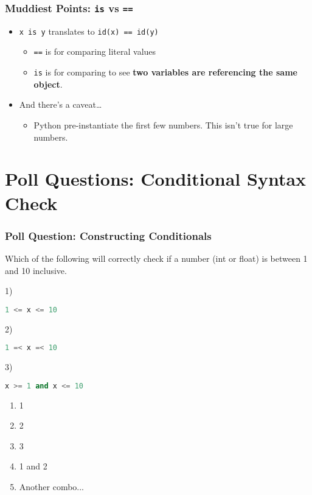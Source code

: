 \documentclass{beamer}
\begin{document}
%
%
\begin{frame}[fragile]
	\frametitle{Muddiest Points: \lstinline|is| vs \lstinline|==|}
  \begin{itemize}
    \item \lstinline|x is y| translates to \lstinline|id(x) == id(y)|
    \begin{itemize}
      \item \lstinline|==| is for comparing literal values
      \item \lstinline|is| is for comparing to see \textbf{two variables are referencing the same object}.
    \end{itemize}
    \item And there's a caveat\ldots 
    \begin{itemize}
      \item Python pre-instantiate the first few numbers. This isn't true for large numbers.
    \end{itemize}
  \end{itemize}
\end{frame}


\section{Poll Questions: Conditional Syntax Check}

%
%
\begin{frame}[fragile]
	\frametitle{Poll Question: Constructing Conditionals}
  Which of the following will correctly check if a number (int or float) is between 1 and 10 inclusive.
	\begin{minipage}{0.69\textwidth}
    1)
		\begin{lstlisting}[language=Python, autogobble,basicstyle=\tiny,numbers=none]
    1 <= x <= 10
		\end{lstlisting}
    \vspace{1cm}
    2)
		\begin{lstlisting}[language=Python, autogobble,basicstyle=\tiny,numbers=none]
    1 =< x =< 10
		\end{lstlisting}
    \vspace{1cm}
    3)
		\begin{lstlisting}[language=Python, autogobble,basicstyle=\tiny,numbers=none]
    x >= 1 and x <= 10
		\end{lstlisting}
	\end{minipage}
	\begin{minipage}{0.29\textwidth}
    \begin{enumerate}[A]
      \item 1
      \item 2
      \item 3
      \item 1 and 2
      \item Another combo...
    \end{enumerate}
	\end{minipage}
\end{frame}
\end{document}
